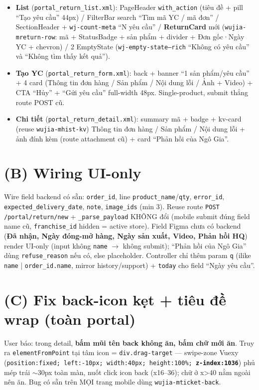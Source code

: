 \begin{itemize}
  \item \textbf{List} (\texttt{portal\_return\_list.xml}): PageHeader \texttt{with\_action}
        (tiêu đề + pill ``Tạo yêu cầu'' 44px) / FilterBar search ``Tìm mã YC / mã đơn'' /
        SectionHeader + \texttt{wj-count-meta} ``N yêu cầu'' / \textbf{ReturnCard} mới
        (\texttt{wujia-mreturn-row}: mã + StatusBadge + sản phẩm + divider + Đơn gốc·Ngày YC +
        chevron) / 2 EmptyState (\texttt{wj-empty-state--rich} ``Không có yêu cầu'' và
        ``Không tìm thấy kết quả'').
  \item \textbf{Tạo YC} (\texttt{portal\_return\_form.xml}): back + banner ``1 sản phẩm/yêu
        cầu'' + 4 card (Thông tin đơn hàng / Sản phẩm / Nội dung lỗi / Ảnh + Video) + CTA
        ``Hủy'' + ``Gửi yêu cầu'' full-width 48px. Single-product, submit thẳng route POST cũ.
  \item \textbf{Chi tiết} (\texttt{portal\_return\_detail.xml}): summary mã + badge + kv-card
        (reuse \texttt{wujia-mhist-kv}) Thông tin đơn hàng / Sản phẩm / Nội dung lỗi + ảnh
        đính kèm (route attachment cũ) + card ``Phản hồi của Ngô Gia''.
\end{itemize}

\section{(B) Wiring UI-only}

Wire field backend có sẵn: \texttt{order\_id}, line \texttt{product\_name}/\texttt{qty},
\texttt{error\_id}, \texttt{expected\_delivery\_date}, \texttt{note}, \texttt{image\_ids}
(min 3). Reuse route \texttt{POST /portal/return/new} + \texttt{\_parse\_payload} KHÔNG đổi
(mobile submit đúng field name cũ, \texttt{franchise\_id} hidden = active store). Field Figma
chưa có backend (\textbf{Đã nhận, Ngày đóng-mở hàng, Ngày sản xuất, Video, Phản hồi HQ}) render
UI-only (input không \texttt{name} \(\rightarrow\) không submit); ``Phản hồi của Ngô Gia'' dùng
\texttt{refuse\_reason} nếu có, else placeholder. Controller chỉ thêm param \texttt{q} (ilike
\texttt{name} | \texttt{order\_id.name}, mirror history/support) + \texttt{today} cho field
``Ngày yêu cầu''.

\section{(C) Fix back-icon kẹt + tiêu đề wrap (toàn portal)}

User báo: trong detail, \textbf{bấm mũi tên back không ăn, bấm chữ mới ăn}. Truy ra
\texttt{elementFromPoint} tại tâm icon = \texttt{div.drag-target} --- swipe-zone Vuexy
(\texttt{position:fixed; left:-10px; width:40px; height:100\%; \textbf{z-index:1036}}) phủ
mép trái \(\sim\)30px toàn màn, nuốt click icon back (x16--36); chữ ở x\textgreater40 nằm ngoài
nên ăn. Bug có sẵn trên MỌI trang mobile dùng \texttt{wujia-mticket-back}.

